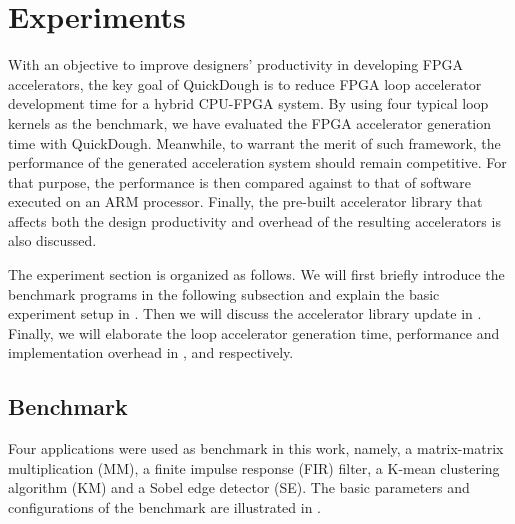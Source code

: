 \section{Experiments}\label{sec:experiments}
With an objective to improve designers' productivity in developing FPGA accelerators, the key goal
of QuickDough is to reduce FPGA loop accelerator development time for a hybrid CPU-FPGA system.
By using four typical loop kernels as the benchmark, we have evaluated the FPGA accelerator generation 
time with QuickDough. Meanwhile, to warrant the merit of such framework, the performance of the 
generated acceleration system should remain competitive. For that purpose, the performance is then 
compared against to that of software executed on an ARM processor. Finally, the pre-built accelerator 
library that affects both the design productivity and overhead of the resulting accelerators is also
discussed.

The experiment section is organized as follows. We will first briefly introduce the benchmark
programs in the following subsection and explain the basic experiment setup in
. Then we will discuss the accelerator library update in
. Finally, we will elaborate the loop accelerator generation time, 
performance and implementation overhead in ,  and
 respectively. 

\subsection{Benchmark} \label{subsec:benchmark}
Four applications were used as benchmark in this work, namely, a matrix-matrix multiplication (MM), a
finite impulse response (FIR) filter, a K-mean clustering algorithm (KM) and a Sobel edge detector
(SE). The basic parameters and configurations of the benchmark are illustrated in 
. 

\begin{table}[htb]
    \centering
    \caption{Detailed Configurations of the Benchmark \label{tab:benchmark-config}}{
        \centering
    }
\end{table}

